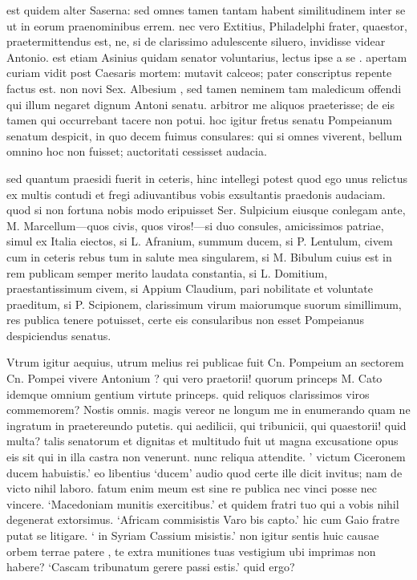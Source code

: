  est quidem alter Saserna: sed omnes tamen tantam habent similitudinem inter se ut in eorum praenominibus errem. nec vero Extitius, Philadelphi frater, quaestor, praetermittendus est, ne, si de clarissimo adulescente siluero, invidisse videar Antonio. est etiam Asinius quidam senator voluntarius, lectus ipse a se . apertam curiam vidit post Caesaris mortem: mutavit calceos; pater conscriptus repente factus est. non novi Sex. Albesium , sed tamen neminem tam maledicum offendi qui illum negaret dignum Antoni senatu. arbitror me aliquos praeterisse; de eis tamen qui occurrebant tacere non potui. hoc igitur fretus senatu Pompeianum senatum despicit, in quo decem fuimus consulares: qui si omnes viverent, bellum omnino hoc non fuisset; auctoritati cessisset audacia.

 sed quantum praesidi fuerit in ceteris, hinc intellegi potest quod ego unus relictus ex multis contudi et fregi adiuvantibus vobis exsultantis praedonis audaciam. quod si non fortuna nobis modo eripuisset Ser. Sulpicium eiusque conlegam ante, M. Marcellum—quos civis, quos viros!—si duo consules, amicissimos patriae, simul ex Italia eiectos, si L. Afranium, summum ducem, si P. Lentulum, civem cum in ceteris rebus tum in salute mea singularem, si M. Bibulum cuius est in rem publicam semper merito laudata constantia, si L. Domitium, praestantissimum civem, si Appium Claudium, pari nobilitate et voluntate praeditum, si P. Scipionem, clarissimum virum maiorumque suorum simillimum, res publica tenere potuisset, certe eis consularibus non esset Pompeianus despiciendus senatus.

 Vtrum igitur aequius, utrum melius rei publicae fuit Cn. Pompeium an sectorem Cn. Pompei vivere Antonium ? qui vero praetorii! quorum princeps M. Cato idemque omnium gentium virtute princeps. quid reliquos clarissimos viros commemorem? Nostis omnis. magis vereor ne longum me in enumerando quam ne ingratum in praetereundo putetis. qui aedilicii, qui tribunicii, qui quaestorii! quid multa? talis senatorum et dignitas et multitudo fuit ut magna excusatione opus eis sit qui in illa castra non venerunt. nunc reliqua attendite. ' victum Ciceronem ducem habuistis.' eo libentius `ducem' audio quod certe ille dicit invitus; nam de victo nihil laboro. fatum enim meum est sine re publica nec vinci posse nec vincere. `Macedoniam munitis exercitibus.' et quidem fratri tuo qui a vobis nihil degenerat extorsimus. `Africam commisistis Varo bis capto.' hic cum Gaio fratre putat se litigare. ` in Syriam Cassium misistis.' non igitur sentis huic causae orbem terrae patere , te extra munitiones tuas vestigium ubi imprimas non habere? `Cascam tribunatum gerere passi estis.' quid ergo?

